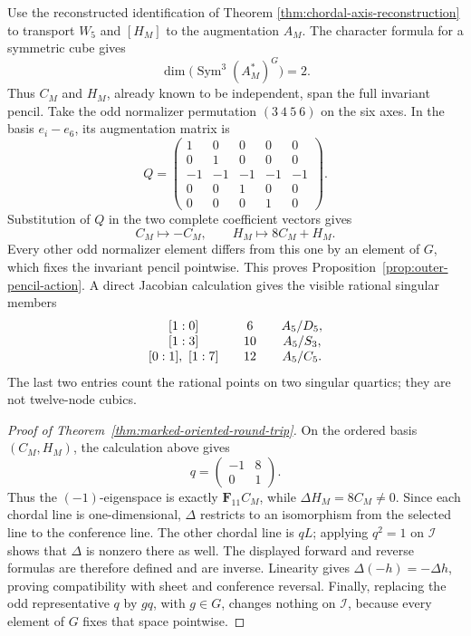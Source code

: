 \documentclass[11pt]{article}
\theoremstyle{definition}
\theoremstyle{remark}
\newcommand{\F}{\mathbf F}
\newcommand{\Sym}{\operatorname{Sym}}
\begin{document}
Use the reconstructed identification of Theorem
\ref{thm:chordal-axis-reconstruction} to transport \(W_5\) and \([H_M]\)
to the augmentation \(A_M\).
The character formula for a symmetric cube gives
\[
 \dim\bigl(\Sym^3(A_M^*)^G\bigr)=2.
\]
Thus \(C_M\) and \(H_M\), already known to be independent, span the full
invariant pencil.  Take the odd normalizer permutation
\((3\ 4\ 5\ 6)\) on the six axes.  In the basis \(e_i-e_6\), its
augmentation matrix is
\[
 Q=\begin{pmatrix}
 1&0&0&0&0\\
 0&1&0&0&0\\
 -1&-1&-1&-1&-1\\
 0&0&1&0&0\\
 0&0&0&1&0
 \end{pmatrix}.
\]
Substitution of \(Q\) in the two complete coefficient vectors gives
\[
 C_M\longmapsto-C_M,\qquad H_M\longmapsto8C_M+H_M.
\]
Every other odd normalizer element differs from this one by an element of
\(G\), which fixes the invariant pencil pointwise.  This proves
Proposition~\ref{prop:outer-pencil-action}.  A direct Jacobian
calculation gives the visible rational singular members
\[
\begin{array}{c@{\qquad}c@{\qquad}c}
\lbrack1:0\rbrack&6&A_5/D_5,\\
\lbrack1:3\rbrack&10&A_5/S_3,\\
\lbrack0:1\rbrack,\ \lbrack1:7\rbrack&12&A_5/C_5.
\end{array}
\]
The last two entries count the rational points on two singular quartics; they
are not twelve-node cubics.

\begin{proof}[Proof of Theorem~\ref{thm:marked-oriented-round-trip}]
On the ordered basis \((C_M,H_M)\), the calculation above gives
\[
 q=\begin{pmatrix}-1&8\\0&1\end{pmatrix}.
\]
Thus the \((-1)\)-eigenspace is exactly \(\F_{11}C_M\), while
\(\Delta H_M=8C_M\ne0\).  Since each chordal line is one-dimensional,
\(\Delta\) restricts to an isomorphism from the selected line to the
conference line.  The other chordal line is \(qL\); applying \(q^2=1\) on
\(\mathcal I\) shows that \(\Delta\) is nonzero there as well.  The displayed
forward and reverse formulas are therefore defined and are inverse.
Linearity gives \(\Delta(-h)=-\Delta h\), proving compatibility with sheet
and conference reversal.  Finally, replacing the odd representative \(q\)
by \(gq\), with \(g\in G\), changes nothing on \(\mathcal I\), because every
element of \(G\) fixes that space pointwise.
\end{proof}
\end{document}
